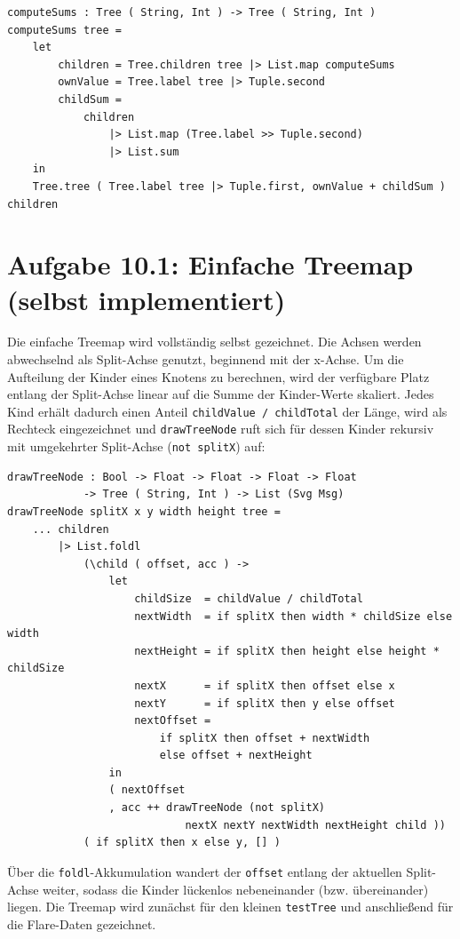 \documentclass[11pt,a4paper]{article}
\begin{document}
\begin{verbatim}
computeSums : Tree ( String, Int ) -> Tree ( String, Int )
computeSums tree =
    let
        children = Tree.children tree |> List.map computeSums
        ownValue = Tree.label tree |> Tuple.second
        childSum =
            children
                |> List.map (Tree.label >> Tuple.second)
                |> List.sum
    in
    Tree.tree ( Tree.label tree |> Tuple.first, ownValue + childSum ) children
\end{verbatim}

\section*{Aufgabe 10.1: Einfache Treemap (selbst implementiert)}

Die einfache Treemap wird vollständig selbst gezeichnet. Die Achsen werden
abwechselnd als Split-Achse genutzt, beginnend mit der x-Achse. Um die
Aufteilung der Kinder eines Knotens zu berechnen, wird der verfügbare Platz
entlang der Split-Achse linear auf die Summe der Kinder-Werte skaliert. Jedes
Kind erhält dadurch einen Anteil \texttt{childValue / childTotal} der Länge,
wird als Rechteck eingezeichnet und \texttt{drawTreeNode} ruft sich für dessen
Kinder rekursiv mit umgekehrter Split-Achse (\texttt{not splitX}) auf:

\begin{verbatim}
drawTreeNode : Bool -> Float -> Float -> Float -> Float
            -> Tree ( String, Int ) -> List (Svg Msg)
drawTreeNode splitX x y width height tree =
    ... children
        |> List.foldl
            (\child ( offset, acc ) ->
                let
                    childSize  = childValue / childTotal
                    nextWidth  = if splitX then width * childSize else width
                    nextHeight = if splitX then height else height * childSize
                    nextX      = if splitX then offset else x
                    nextY      = if splitX then y else offset
                    nextOffset =
                        if splitX then offset + nextWidth
                        else offset + nextHeight
                in
                ( nextOffset
                , acc ++ drawTreeNode (not splitX)
                            nextX nextY nextWidth nextHeight child ))
            ( if splitX then x else y, [] )
\end{verbatim}

Über die \texttt{foldl}-Akkumulation wandert der \texttt{offset} entlang der
aktuellen Split-Achse weiter, sodass die Kinder lückenlos nebeneinander (bzw.
übereinander) liegen. Die Treemap wird zunächst für den kleinen
\texttt{testTree} und anschließend für die Flare-Daten gezeichnet.
\end{document}

